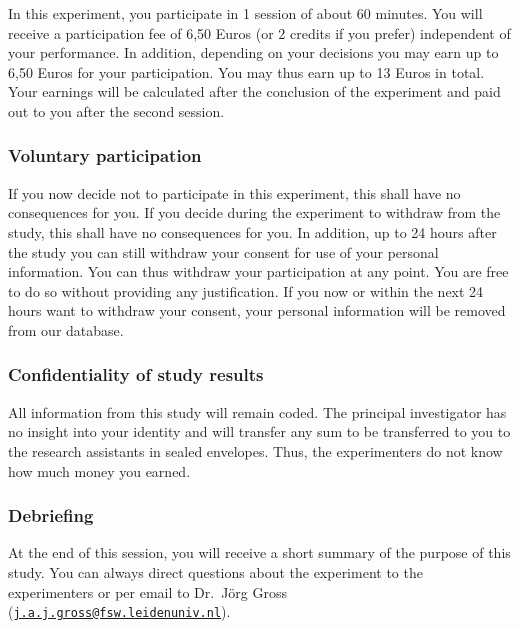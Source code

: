 \documentclass[man]{apa6}
\begin{document}
In this experiment, you participate in 1 session of about 60 minutes.
You will receive a participation fee of 6,50 Euros (or 2 credits if you
prefer) independent of your performance. In addition, depending on your
decisions you may earn up to 6,50 Euros for your participation. You may
thus earn up to 13 Euros in total. Your earnings will be calculated
after the conclusion of the experiment and paid out to you after the
second session.

\hypertarget{voluntary-participation}{%
\subsubsection{Voluntary participation}\label{voluntary-participation}}

If you now decide not to participate in this experiment, this shall have
no consequences for you. If you decide during the experiment to withdraw
from the study, this shall have no consequences for you. In addition, up
to 24 hours after the study you can still withdraw your consent for use
of your personal information. You can thus withdraw your participation
at any point. You are free to do so without providing any justification.
If you now or within the next 24 hours want to withdraw your consent,
your personal information will be removed from our database.

\hypertarget{confidentiality-of-study-results}{%
\subsubsection{Confidentiality of study
results}\label{confidentiality-of-study-results}}

All information from this study will remain coded. The principal
investigator has no insight into your identity and will transfer any sum
to be transferred to you to the research assistants in sealed envelopes.
Thus, the experimenters do not know how much money you earned.

\hypertarget{debriefing}{%
\subsubsection{Debriefing}\label{debriefing}}

At the end of this session, you will receive a short summary of the
purpose of this study. You can always direct questions about the
experiment to the experimenters or per email to Dr.~Jörg Gross
(\href{mailto:j.a.j.gross@fsw.leidenuniv.nl}{\nolinkurl{j.a.j.gross@fsw.leidenuniv.nl}}).
\end{document}
